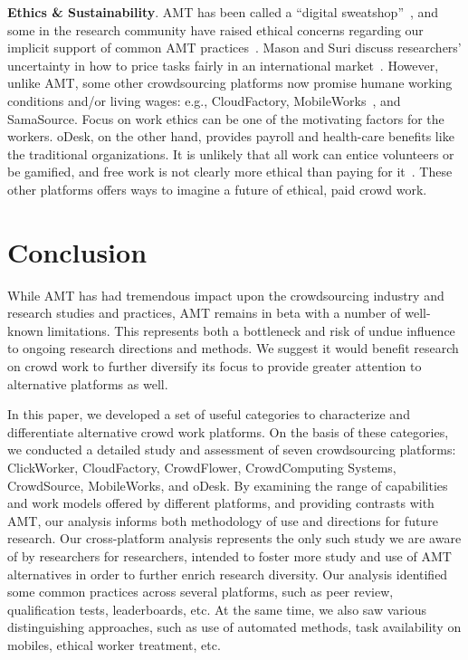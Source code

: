 \documentclass{sigchi}
\begin{document}
{\bf Ethics \& Sustainability}. AMT has been called a ``digital sweatshop''~\cite{Cushing13}, and some in the research community have raised ethical concerns regarding our implicit support of 
common AMT practices~\cite{Silberman10,fort2011amazon,Irani13,adda2013economic}. Mason and Suri discuss researchers' uncertainty in how to price tasks fairly in an international market~\cite{mason2012conducting}. 
However, unlike AMT, some other crowdsourcing platforms now promise humane working conditions and/or living wages: e.g., CloudFactory, MobileWorks~\cite{narula2011mobileworks,Kulkarni12}, and SamaSource. Focus on work ethics can be one of the motivating factors for the workers. oDesk, on the other hand, provides payroll and health-care benefits like the traditional organizations. It is unlikely that all work can entice volunteers or be gamified, and free work is not clearly more ethical than paying for it~\cite{fort2011amazon}. These other platforms offers ways to imagine a future of ethical, paid crowd work.













\section{Conclusion}

While AMT has had tremendous impact upon the crowdsourcing industry and research studies and practices, AMT remains in beta  with a number of well-known limitations. This represents both a bottleneck and risk of undue influence to ongoing research directions and methods. We suggest it would benefit research on crowd work to further diversify its focus to provide greater attention to alternative platforms as well.

In this paper, we developed a set of useful categories to characterize and differentiate alternative crowd work platforms. 
On the basis of these categories, we conducted a detailed study and assessment of seven crowdsourcing platforms: ClickWorker, CloudFactory, CrowdFlower, CrowdComputing Systems, CrowdSource, MobileWorks, and oDesk. By examining the range of capabilities and work models offered by different platforms, and providing contrasts with AMT, our analysis informs both methodology of use and directions for future research. Our cross-platform analysis represents the only such study we are aware of by researchers for researchers, intended to foster more study and use of AMT alternatives in order to further enrich research diversity. 
Our analysis identified some common practices across several platforms, such as peer review, qualification tests, leaderboards, etc. At the same time, we also saw various distinguishing approaches, such as use of automated methods, task availability on mobiles, ethical worker treatment, etc. 
\end{document}
